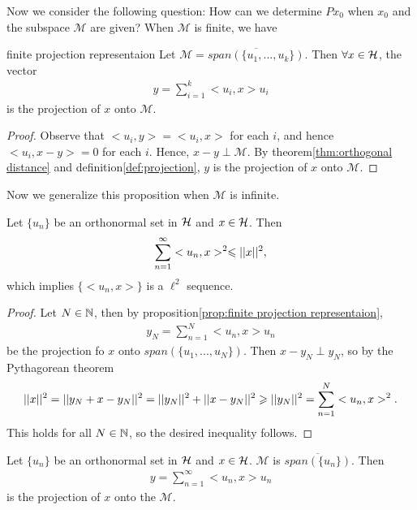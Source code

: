 Now we consider the following question: How can we determine $Px_0$ when $x_0$ and the subspace
$\mathcal{M}$ are given? When $\mathcal{M}$ is finite, we have

\begin{proposition}{}{finite projection representaion}
    Let $\mathcal{M}=\overline{span(\{u_1,...,u_k\})}$. Then $\forall x\in \mathcal{H}$, the vector
    \begin{align*}
        y = \sum\limits_{i=1}^{k} <u_i,x> u_i
    \end{align*}
    is the projection of $x$ onto $\mathcal{M}$. 
\end{proposition}

\begin{proof}
    Observe that $<u_i,y>=<u_i,x>$ for each $i$, and hence $<u_i,x-y> = 0$ for each $i$. Hence, $x-y\perp \mathcal{M}$. 
    By theorem\ref{thm:orthogonal distance} and definition\ref{def:projection}, $y$ is the projection of $x$ onto $\mathcal{M}$. 
\end{proof}

Now we generalize this proposition when $\mathcal{M}$ is infinite.

\begin{lemma}{}{}
    Let $\{u_n\}$ be an orthonormal set in $\mathcal{H}$ and $x\in \mathcal{H}$. Then 
    \begin{align*}
        \sum\limits_{n=1}^{\infty} <u_n,x>^2\leqslant ||x||^2, 
    \end{align*} 
    which implies $\{<u_n,x>\}$ is a $\ell^2$ sequence.\\
\end{lemma}

\begin{proof}
    Let $N\in\mathbb{N}$, then by proposition\ref{prop:finite projection representaion}, 
    \begin{align*}
        y_N = \sum\limits_{n=1}^{N}<u_n,x>u_n
    \end{align*}
    be the projection fo $x$ onto $span(\{u_1,...,u_N\})$. Then $x-y_N\perp y_N$, so by the Pythagorean theorem
    \begin{align*}
        ||x||^2 = ||y_N+x-y_N||^2 = ||y_N||^2 + ||x-y_N||^2 \geqslant ||y_N||^2= \sum\limits_{n=1}^{N} <u_n,x>^2.
    \end{align*}
    This holds for all $N \in \mathbb{N}$, so the desired inequality follows. 
\end{proof}

\begin{theorem}{}{}
    Let $\{u_n\}$ be an orthonormal set in $\mathcal{H}$ and $x\in\mathcal{H}$. $\mathcal{M}$ is $\overline{span(\{u_n\})}$. Then
    \begin{align*}
        y=\sum\limits_{n=1}^{\infty} <u_n,x>u_n
    \end{align*}
    is the projection of $x$ onto the $\mathcal{M}$.
\end{theorem}

